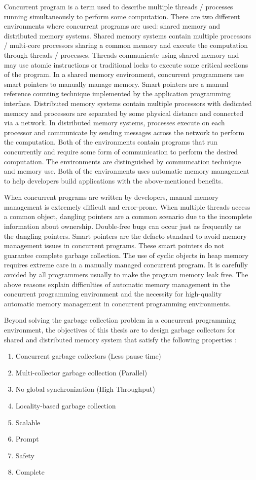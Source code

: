 Concurrent program is a term used to describe multiple threads / processes running simultaneously to perform some computation. There are two different environments where concurrent programs are used: shared memory and distributed memory systems. Shared memory systems contain multiple processors / multi-core processors sharing a common memory and execute the computation through threads / processes. Threads communicate using shared memory and may use atomic instructions or traditional locks to execute some critical sections of the program. 
In a shared memory environment, concurrent programmers use smart pointers to manually manage memory. Smart pointers are a manual reference counting technique implemented by the application programming interface. Distributed memory systems contain multiple processors with dedicated memory and processors are separated by some physical distance and connected via a network. In distributed memory systems, processes execute on each processor and  communicate by sending messages across the network to perform the computation. Both of the environments contain programs that run concurrently and require some form of communication to perform the desired computation. The environments are distinguished by communcation technique and memory use. Both of the environments uses automatic memory management to help developers build applications with the above-mentioned benefits. 

When concurrent programs are written by developers, manual memory management is extremely difficult and error-prone. When multiple threads access a common object, dangling pointers are a common scenario due to the incomplete information about ownership. Double-free bugs can occur just as frequently as the dangling pointers. Smart pointers are the defacto standard to avoid memory management issues in concurrent programs. These smart pointers do not guarantee complete garbage collection. The use of cyclic objects in heap memory requires extreme care in a manually managed concurrent program. It is carefully avoided by all programmers usually to make the program memory leak free. The above reasons explain difficulties of automatic memory management in the concurrent programming environment and the necessity for high-quality automatic memory management in concurrent programming environments. 

Beyond solving the garbage collection problem in a concurrent programming environment, the objectives of this thesis are to design garbage collectors for shared and distributed memory system that satisfy the following properties :
\begin{enumerate}
	\item Concurrent garbage collectors (Less pause time)
	\item Multi-collector garbage collection (Parallel)
	\item No global synchronization (High Throughput)
	\item Locality-based garbage collection
	\item Scalable
	\item Prompt
	\item Safety
	\item Complete
\end{enumerate}


